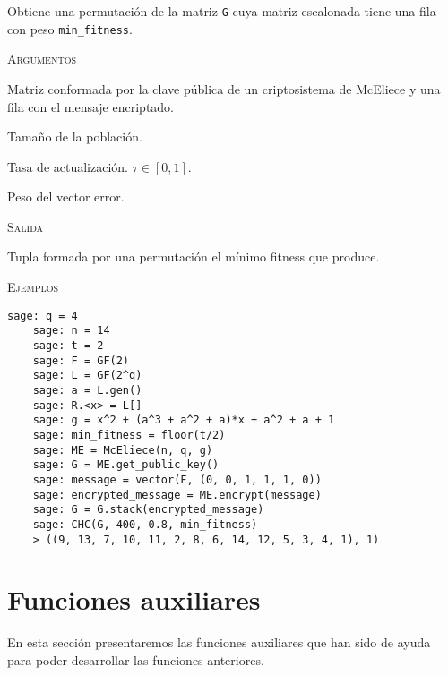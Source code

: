 \begin{description}[leftmargin=1em, font=\normalfont\ttfamily, style=nextline]
  \item[CHC(G, N, tau, min\_fitness)] Obtiene una permutación de la matriz \texttt{G} cuya matriz escalonada tiene una fila con peso \texttt{min\_fitness}.

  \textsc{Argumentos}
  \begin{description}[font=\normalfont\ttfamily]
    \item[G] Matriz conformada por la clave pública de un criptosistema de McEliece y una fila con el mensaje encriptado.
    \item[N] Tamaño de la población.
    \item[tau] Tasa de actualización. $\tau \in [0,1]$.
    \item[min\_fitness] Peso del vector error. 
  \end{description}

  \textsc{Salida}
  \begin{description}[font=\normalfont\ttfamily]
    \item[] Tupla formada por una permutación el mínimo fitness que produce.
  \end{description}

  \textsc{Ejemplos}
  \begin{lstlisting}[gobble=4]
    sage: q = 4
    sage: n = 14
    sage: t = 2
    sage: F = GF(2)
    sage: L = GF(2^q)
    sage: a = L.gen()
    sage: R.<x> = L[]
    sage: g = x^2 + (a^3 + a^2 + a)*x + a^2 + a + 1
    sage: min_fitness = floor(t/2)
    sage: ME = McEliece(n, q, g)
    sage: G = ME.get_public_key()
    sage: message = vector(F, (0, 0, 1, 1, 1, 0))
    sage: encrypted_message = ME.encrypt(message)
    sage: G = G.stack(encrypted_message)
    sage: CHC(G, 400, 0.8, min_fitness)
    > ((9, 13, 7, 10, 11, 2, 8, 6, 14, 12, 5, 3, 4, 1), 1)
  \end{lstlisting}
\end{description}

\section{Funciones auxiliares}

En esta sección presentaremos las funciones auxiliares que han sido de ayuda para poder desarrollar las funciones anteriores.


